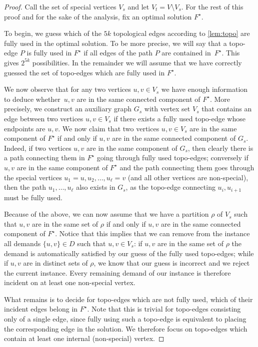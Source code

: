 \documentclass[a4paper]{article}
\theoremstyle{plain}
\begin{document}
\begin{proof}
%
%
Call the set of special vertices $V_s$ and let $V_t=V\setminus V_s$. For the rest of
this proof and for the sake of the analysis, fix an optimal solution $F^\star$.

To begin, we guess which of the $5k$ topological edges according to \cref{lem:topo} are fully used in the
optimal solution. To be more precise, we will say that a topo-edge $P$ is fully
used in $F^\star$ if all edges of the path $P$ are contained in~$F^\star$. This gives
$2^{5k}$ possibilities. In the remainder we will assume that we have correctly
guessed the set of topo-edges which are fully used in $F^\star$.

We now observe that for any two vertices $u,v\in V_s$ we have enough
information to deduce whether~$u,v$ are in the same connected component of
$F^\star$. More precisely, we construct an auxiliary graph $G_s$ with vertex
set $V_s$ that contains an edge between two vertices $u,v\in V_s$ if there
exists a fully used topo-edge whose endpoints are $u,v$.  We now claim that two
vertices $u,v\in V_s$ are in the same component of $F^\star$ if and only if
$u,v$ are in the same connected component of $G_s$. Indeed, if two vertices
$u,v$ are in the same component of $G_s$, then clearly there is a path
connecting them in $F^\star$ going through fully used topo-edges; conversely if
$u,v$ are in the same component of $F^\star$ and the path connecting them goes
through the special vertices $u_1=u, u_2,\ldots, u_\ell=v$ (and all other
vertices are non-special), then the path $u_1,\ldots, u_\ell$ also exists in
$G_s$, as the topo-edge connecting $u_i, u_{i+1}$ must be fully used.

Because of the above, we can now assume that we have a partition $\rho$ of $V_s$
such that $u,v$ are in the same set of $\rho$ if and only if $u,v$ are in the
same connected component of $F^\star$. Notice that this implies that we can remove
from the instance all demands $\{u,v\}\in D$ such that $u,v\in V_s$: if $u,v$ are in
the same set of $\rho$ the demand is automatically satisfied by our guess of the
fully used topo-edges; while if $u,v$ are in distinct sets of $\rho$, we know
that our guess is incorrect and we reject the current instance. Every remaining
demand of our instance is therefore incident on at least one non-special
vertex.


What remains is to decide for topo-edges which are not fully used, which of
their incident edges belong in $F^\star$. Note that this is trivial for topo-edges
consisting only of a single edge, since fully using such a topo-edge is
equivalent to placing the corresponding edge in the solution. We therefore
focus on topo-edges which contain at least one internal (non-special) vertex. 


\end{proof}
\end{document}
